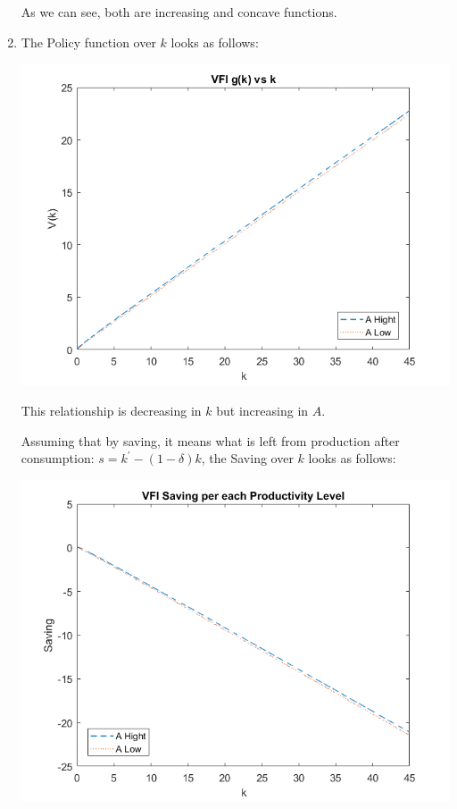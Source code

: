 \documentclass[12pt]{article}%
\begin{document}
\begin{enumerate}
	
	As we can see, both are increasing and concave functions. 
	
	\item  The Policy function over $k$ looks as follows:
	
	\begin{center}
		\includegraphics[width=1\linewidth]{g_k}
	\end{center}

This relationship is decreasing in $k$ but increasing in $A$.
	
	Assuming that by saving, it means what is left from production after consumption: $s=k^{\prime}-(1-\delta)k$, the Saving over $k$ looks as follows:
	
	\begin{center}
		\includegraphics[width=1\linewidth]{saving}
	\end{center}
	

\end{enumerate}
\end{document}
